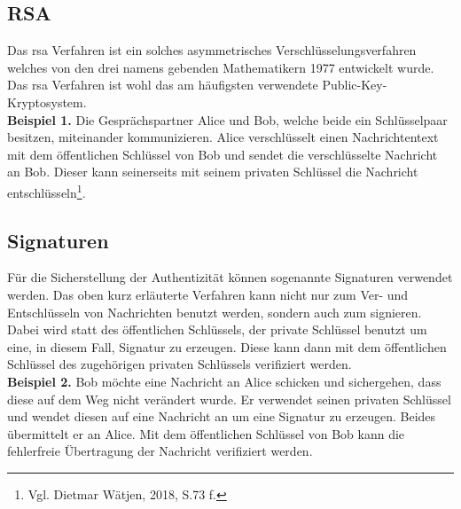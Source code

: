 {		\subsection{RSA}
		Das \gls{rsa} Verfahren ist ein solches asymmetrisches Verschlüsselungsverfahren welches von den drei namens gebenden Mathematikern 1977 entwickelt wurde. Das \gls{rsa} Verfahren ist wohl das am häufigsten verwendete Public-Key-Kryptosystem.\\
		\textbf{Beispiel 1.} Die Gesprächspartner Alice und Bob, welche beide ein Schlüsselpaar besitzen, miteinander kommunizieren. Alice verschlüsselt einen Nachrichtentext mit dem öffentlichen Schlüssel von Bob und sendet die verschlüsselte Nachricht an Bob. Dieser kann seinerseits mit seinem privaten Schlüssel die Nachricht entschlüsseln\footnote{Vgl. Dietmar Wätjen, 2018, S.73 f.}.\\
		\subsection{Signaturen}
		Für die Sicherstellung der Authentizität können sogenannte Signaturen verwendet werden. Das oben kurz erläuterte Verfahren kann nicht nur zum Ver- und Entschlüsseln von Nachrichten benutzt werden, sondern auch zum signieren.\\
		Dabei wird statt des öffentlichen Schlüssels, der private Schlüssel benutzt um eine, in diesem Fall, Signatur zu erzeugen. Diese kann dann mit dem öffentlichen Schlüssel des zugehörigen privaten Schlüssels verifiziert werden.\\
		\textbf{Beispiel 2.} Bob möchte eine Nachricht an Alice schicken und sichergehen, dass diese auf dem Weg nicht verändert wurde. Er verwendet seinen privaten Schlüssel und wendet diesen auf eine Nachricht an um eine Signatur zu erzeugen. Beides übermittelt er an Alice. Mit dem öffentlichen Schlüssel von Bob kann die fehlerfreie Übertragung der Nachricht verifiziert werden.
	}
			
